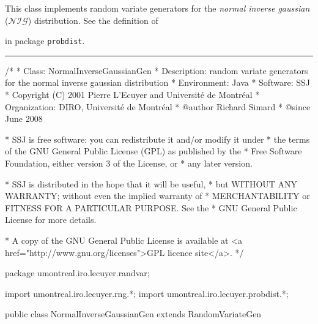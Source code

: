 
\newcommand{\nig}{\emph{normal inverse gaussian}}

This class implements random variate generators for 
the \nig{} ($\mathcal{NIG}$) distribution. See the definition of
\begin{latexonly}%
in package \texttt{probdist}.
\end{latexonly}


\bigskip\hrule\bigskip

\begin{code}
\begin{hide}
/*
 * Class:        NormalInverseGaussianGen
 * Description:  random variate generators for the normal inverse gaussian distribution
 * Environment:  Java
 * Software:     SSJ 
 * Copyright (C) 2001  Pierre L'Ecuyer and Université de Montréal
 * Organization: DIRO, Université de Montréal
 * @author       Richard Simard
 * @since        June 2008

 * SSJ is free software: you can redistribute it and/or modify it under
 * the terms of the GNU General Public License (GPL) as published by the
 * Free Software Foundation, either version 3 of the License, or
 * any later version.

 * SSJ is distributed in the hope that it will be useful,
 * but WITHOUT ANY WARRANTY; without even the implied warranty of
 * MERCHANTABILITY or FITNESS FOR A PARTICULAR PURPOSE.  See the
 * GNU General Public License for more details.

 * A copy of the GNU General Public License is available at
   <a href="http://www.gnu.org/licenses">GPL licence site</a>.
 */
\end{hide}
package umontreal.iro.lecuyer.randvar;\begin{hide}
import umontreal.iro.lecuyer.rng.*;
import umontreal.iro.lecuyer.probdist.*;
\end{hide}

public class NormalInverseGaussianGen extends RandomVariateGen \begin{hide} {
   protected double mu;
   protected double delta = -1.0;
   protected double alpha = -1.0;
   protected double beta = -2.0;
   protected double gamma = -1.0;
\end{hide}
\end{code}

